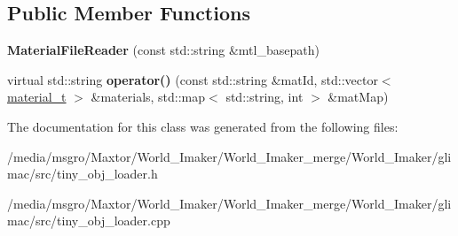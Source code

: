 \subsection*{Public Member Functions}
\begin{DoxyCompactItemize}
\item 
\mbox{\label{classtinyobj_1_1MaterialFileReader_a824d0100284310fe213d86ad443cc575}} 
{\bfseries Material\+File\+Reader} (const std\+::string \&mtl\+\_\+basepath)
\item 
\mbox{\label{classtinyobj_1_1MaterialFileReader_a9374212c9997aa8ac0d15d97f67b25f8}} 
virtual std\+::string {\bfseries operator()} (const std\+::string \&mat\+Id, std\+::vector$<$ \hyperlink{structtinyobj_1_1material__t}{material\+\_\+t} $>$ \&materials, std\+::map$<$ std\+::string, int $>$ \&mat\+Map)
\end{DoxyCompactItemize}


The documentation for this class was generated from the following files\+:\begin{DoxyCompactItemize}
\item 
/media/msgro/\+Maxtor/\+World\+\_\+\+Imaker/\+World\+\_\+\+Imaker\+\_\+merge/\+World\+\_\+\+Imaker/glimac/src/tiny\+\_\+obj\+\_\+loader.\+h\item 
/media/msgro/\+Maxtor/\+World\+\_\+\+Imaker/\+World\+\_\+\+Imaker\+\_\+merge/\+World\+\_\+\+Imaker/glimac/src/tiny\+\_\+obj\+\_\+loader.\+cpp\end{DoxyCompactItemize}
